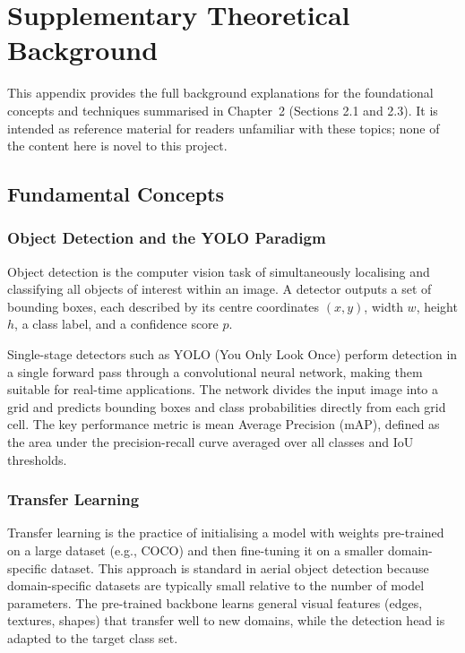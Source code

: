 \documentclass[12pt,a4paper]{report}
\begin{document}
\appendix

\chapter{Supplementary Theoretical Background}
\label{app:theory}

This appendix provides the full background explanations for the
foundational concepts and techniques summarised in
Chapter~2 (Sections 2.1 and 2.3). It is intended as reference material for
readers unfamiliar with these topics; none of the content here is novel to
this project.

\section{Fundamental Concepts}

\subsection{Object Detection and the YOLO Paradigm}

Object detection is the computer vision task of simultaneously localising
and classifying all objects of interest within an image. A detector outputs
a set of bounding boxes, each described by its centre coordinates $(x, y)$,
width $w$, height $h$, a class label, and a confidence score $p$.

Single-stage detectors such as YOLO (You Only Look Once) perform detection
in a single forward pass through a convolutional neural network, making them
suitable for real-time applications. The network divides the input image into
a grid and predicts bounding boxes and class probabilities directly from each
grid cell. The key performance metric is mean Average Precision (mAP), defined
as the area under the precision-recall curve averaged over all classes and
IoU thresholds.

\subsection{Transfer Learning}

Transfer learning is the practice of initialising a model with weights
pre-trained on a large dataset (e.g., COCO) and then fine-tuning it on a
smaller domain-specific dataset. This approach is standard in aerial object
detection because domain-specific datasets are typically small relative to
the number of model parameters. The pre-trained backbone learns general
visual features (edges, textures, shapes) that transfer well to new domains,
while the detection head is adapted to the target class set.
\end{document}
